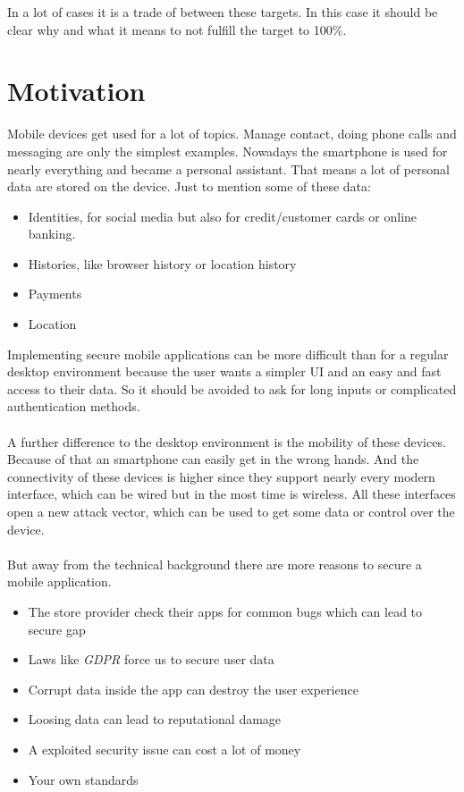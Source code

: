 In a lot of cases it is a trade of between these targets. In this case it should be clear why and what it means to not fulfill the target to 100\%.

\newpage
\section{Motivation}
\label{chp:intro:sec:motivation}

Mobile devices get used for a lot of topics. Manage contact, doing phone calls and messaging are only the simplest examples. Nowadays the smartphone is used for nearly everything and became a personal assistant. That means a lot of personal data are stored on the device. Just to mention some of these data:

\begin{itemize}
	\item Identities, for social media but also for credit/customer cards or online banking.
	\item Histories, like browser history or location history
	\item Payments
	\item Location
\end{itemize}

Implementing secure mobile applications can be more difficult than for a regular desktop environment because the user wants a simpler UI and an easy and fast access to their data. So it should be avoided to ask for long inputs or complicated authentication methods.\\
\\
A further difference to the desktop environment is the mobility of these devices. Because of that an smartphone can easily get in the wrong hands. And the connectivity of these devices is higher since they support nearly every modern interface, which can be wired but in the most time is wireless. All these interfaces open a new attack vector, which can be used to get some data or control over the device.\\
\\
But away from the technical background there are more reasons to secure a mobile application. \\
\begin{itemize}
	\item The store provider check their apps for common bugs which can lead to secure gap
	\item Laws like \textit{GDPR} force us to secure user data
	\item Corrupt data inside the app can destroy the user experience
	\item Loosing data can lead to reputational damage
	\item A exploited security issue can cost a lot of money
	\item Your own standards
\end{itemize}


